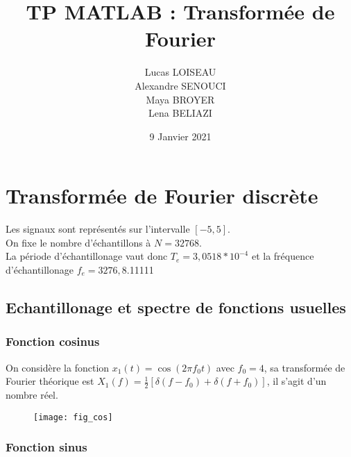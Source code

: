 \documentclass{article}
\title{TP MATLAB : Transformée de Fourier}
\date{9 Janvier 2021}
\author{Lucas LOISEAU \\ Alexandre SENOUCI \\ Maya BROYER \\ Lena BELIAZI}
\begin{document}
\maketitle
\section{Transformée de Fourier discrète}
Les signaux sont représentés sur l'intervalle $[-5,5]$. \\
On fixe le nombre d'échantillons à $N=32768$. \\
La période d'échantillonage vaut donc $T_e = 3,0518 * 10^{-4}$ et la fréquence d'échantillonage $f_e=3276,8$.11111
\subsection{Echantillonage et spectre de fonctions usuelles}
\subsubsection{Fonction cosinus}
On considère la fonction $x_1(t)=\cos(2\pi f_0 t)$ avec $f_0=4$, sa transformée de Fourier théorique est $X_1(f)=\frac{1}{2}[\delta(f-f_0)+\delta(f+f_0)]$, il s'agit d'un nombre réel.
\begin{figure}[h]
\texttt{[image: fig\_cos]}
\centering
\end{figure}

\subsubsection{Fonction sinus}
\end{document}
